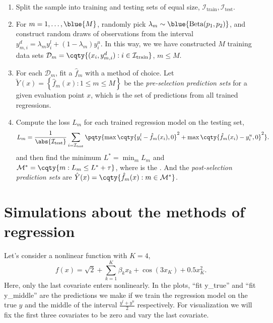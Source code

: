 \documentclass[12pt]{article}
\begin{document}
\begin{enumerate}
    \item Split the sample into training and testing sets of equal size, \(\mathcal{I}_{\text{train}}, \mathcal{I}_{\text{test}}\).
    \item For \(m = 1,\dots, \blue{M}\), randomly pick \(\lambda_{m} \sim \blue{\text{Beta}(p_{1}, p_{2})}\), and construct random draws of observations from the interval \(y_{m,i}^{d} = \lambda_{m}y^{l}_{i} + (1 - \lambda_{m}) y^{u}_{i}\). In this way, we we have constructed \(M\) training data sets \(\mathcal{D}_{m} = \cqty{(x_{i}, y_{m,i}^{d}): i \in \mathcal{I}_{\text{train}}}\), \(m\leq M\).
    \item For each \(\mathcal{D}_{m}\), fit a  \(\hat{f}_{m}\) with a method of choice. Let \(\tilde{Y}(x) = \left\{\hat{f}_{m}(x): 1\leq m\leq M\right\}\) be the \textit{pre-selection prediction sets} for a given evaluation point \(x\), which is the set of predictions from all trained regressions.
    \item Compute the loss \(L_{m}\) for each trained regression model on the testing set,
          \begin{equation*}
              L_{m} = \frac{1}{\abs{\mathcal{I}_{\text{test}}}}\sum_{i = \mathcal{I}_{\text{test}}} \pqty{\max\cqty{y_{i}^{l} - \hat{f}_{m}(x_{i}), 0}^{2} + \max\cqty{\hat{f}_{m}(x_{i}) - y_{i}^{u}, 0}^{2}}.
          \end{equation*}
          and then find the  minimum \(L^{*} = \min_{m} L_{m}\) and \(\mathcal{M}^{*} = \cqty{m: L_{m} \leq L^{*} + \tau}\), where \blue{\(\tau\)} is the . And the \textit{post-selection prediction sets} are \(\hat{Y}(x) = \cqty{\hat{f}_{m}(x): m\in \mathcal{M}^{*}}\).
\end{enumerate}

\section{Simulations about the methods of regression}
Let's consider a nonlinear function with \(K = 4\),
\begin{equation*}
    f(x) = \sqrt{2} + \sum_{k = 1}^{K} \beta_{k} x_{k} + \cos(3x_{K}) + 0.5 x_{K}^{2}.
\end{equation*}
Here, only the last covariate enters nonlinearly. In the plots, ``fit y\_true'' and ``fit y\_middle'' are the predictions we make if we train the regression model on the true \(y\) and the middle of the interval \(\frac{y^{l} + y^{u}}{2}\) respectively.
For visualization we will fix the first three covariates to be zero and vary the last covariate.
\end{document}
